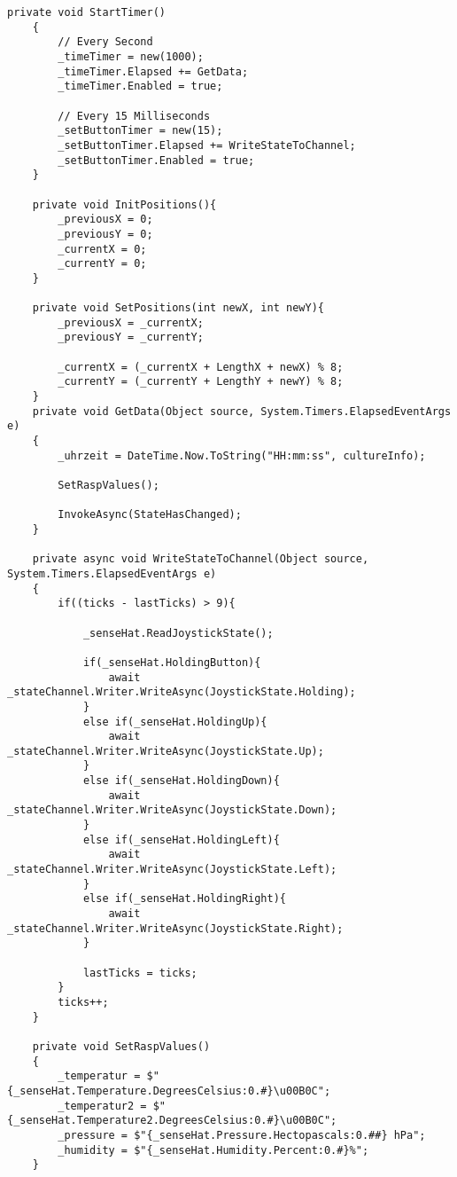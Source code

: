 \begin{lstlisting}[language={[Sharp]C}, caption=Kompletter Demo Code,
	label=lst:DemoCode]
    private void StartTimer()
    {
        // Every Second
        _timeTimer = new(1000);
        _timeTimer.Elapsed += GetData;
        _timeTimer.Enabled = true;

        // Every 15 Milliseconds
        _setButtonTimer = new(15);
        _setButtonTimer.Elapsed += WriteStateToChannel;
        _setButtonTimer.Enabled = true;
    }

    private void InitPositions(){
        _previousX = 0;
        _previousY = 0;
        _currentX = 0;
        _currentY = 0;
    }

    private void SetPositions(int newX, int newY){
        _previousX = _currentX;
        _previousY = _currentY;

        _currentX = (_currentX + LengthX + newX) % 8;
        _currentY = (_currentY + LengthY + newY) % 8;
    }
    private void GetData(Object source, System.Timers.ElapsedEventArgs e)
    {
        _uhrzeit = DateTime.Now.ToString("HH:mm:ss", cultureInfo);

        SetRaspValues();

        InvokeAsync(StateHasChanged);
    }

    private async void WriteStateToChannel(Object source, System.Timers.ElapsedEventArgs e)
    {
        if((ticks - lastTicks) > 9){

            _senseHat.ReadJoystickState();

            if(_senseHat.HoldingButton){
                await _stateChannel.Writer.WriteAsync(JoystickState.Holding);
            }
            else if(_senseHat.HoldingUp){
                await _stateChannel.Writer.WriteAsync(JoystickState.Up);
            }
            else if(_senseHat.HoldingDown){
                await _stateChannel.Writer.WriteAsync(JoystickState.Down);
            }
            else if(_senseHat.HoldingLeft){
                await _stateChannel.Writer.WriteAsync(JoystickState.Left);
            }
            else if(_senseHat.HoldingRight){
                await _stateChannel.Writer.WriteAsync(JoystickState.Right);
            }

            lastTicks = ticks;
        }
        ticks++;
    }

    private void SetRaspValues()
    {
        _temperatur = $"{_senseHat.Temperature.DegreesCelsius:0.#}\u00B0C";
        _temperatur2 = $"{_senseHat.Temperature2.DegreesCelsius:0.#}\u00B0C";
        _pressure = $"{_senseHat.Pressure.Hectopascals:0.##} hPa";
        _humidity = $"{_senseHat.Humidity.Percent:0.#}%";
    }


\end{lstlisting}
